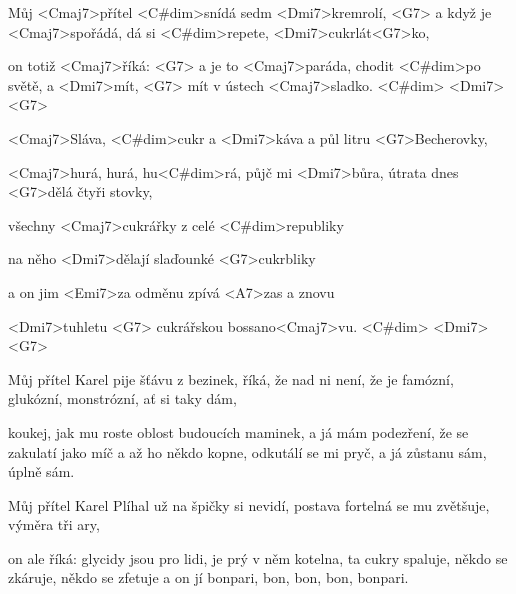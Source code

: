 

\zs
Můj <Cmaj7>přítel <C#dim>snídá sedm <Dmi7>kremrolí, <G7>
a když je <Cmaj7>spořádá, dá si <C#dim>repete,
<Dmi7>cukrlát<G7>ko,

on totiž <Cmaj7>říká: 
<G7>
a je to <Cmaj7>paráda, chodit <C#dim>po světě,
a <Dmi7>mít, <G7> mít v ústech <Cmaj7>sladko. <C#dim> 
<Dmi7> <G7>
\ks


\zr
<Cmaj7>Sláva, <C#dim>cukr a <Dmi7>káva a půl litru 
<G7>Becherovky,

<Cmaj7>hurá, hurá, hu<C#dim>rá, půjč mi <Dmi7>bůra, útrata dnes 
<G7>dělá čtyři stovky,

všechny <Cmaj7>cukrářky z celé <C#dim>republiky

na něho <Dmi7>dělají slaďounké <G7>cukrbliky

a on jim <Emi7>za odměnu zpívá <A7>zas a znovu

<Dmi7>tuhletu <G7> cukrářskou bossano<Cmaj7>vu. <C#dim> 
<Dmi7> <G7>
\kr

\zs
Můj přítel Karel pije šťávu z bezinek,
říká, že nad ni není,
že je famózní, glukózní, monstrózní, ať si taky dám,

koukej, jak mu roste oblost budoucích maminek,
a já mám podezření,
že se zakulatí jako míč
a až ho někdo kopne, odkutálí se mi pryč,
a já zůstanu sám, úplně sám.
\ks

\zr \kr

\zs
Můj přítel Karel Plíhal už na špičky si nevidí,
postava fortelná se mu zvětšuje,
výměra tři ary,

on ale říká: glycidy jsou pro lidi,
je prý v něm kotelna, ta cukry spaluje,
někdo se zkáruje, někdo se zfetuje
a on jí bonpari, bon, bon, bon, bonpari.
\ks

\zr \kr

\kp





